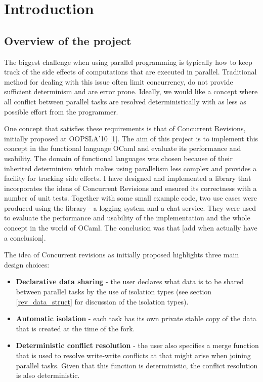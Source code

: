 \documentclass[12pt,twoside,notitlepage]{report}
\begin{document}
\chapter{Introduction}

\section{Overview of the project}
The biggest challenge when using parallel programming is typically how to keep track of the side effects of computations that are executed in parallel. Traditional method for dealing with this issue often limit concurrency, do not provide sufficient determinism and are error prone. Ideally, we would like a concept where all conflict between parallel tasks are resolved deterministically with as less as possible effort from the programmer. 

One concept that satisfies these requirements is that of Concurrent Revisions, initially proposed at OOPSLA'10 [1]. The aim of this project is to implement this concept in the functional language OCaml and evaluate its performance and usability. The domain of functional languages was chosen because of their inherited determinism which makes using parallelism less complex and provides a facility for tracking side effects. I have designed and implemented a library that incorporates the ideas of Concurrent Revisions and ensured its correctness with a number of unit tests. Together with some small example code, two use cases were produced using the library - a logging system and a chat service. They were used to evaluate the performance and usability of the implementation and the whole concept in the world of OCaml. The conclusion was that [add when actually have a conclusion].  

The idea of Concurrent revisions as initially proposed highlights three main design choices:
\begin{itemize}
\item {\bfseries Declarative data sharing} - the user declares what data is to be shared between parallel tasks by the use of isolation types (see section \ref{rev_data_struct} for discussion of the isolation types).  
 
\item {\bfseries Automatic isolation} - each task has its own private stable copy of the data that is created at the time of the fork.

\item {\bfseries Deterministic conflict resolution} - the user also specifies a merge function that is used to resolve write-write conflicts at that might arise when joining parallel tasks. Given that this function is deterministic, the conflict resolution is also deterministic.

\end{itemize}
\end{document}
